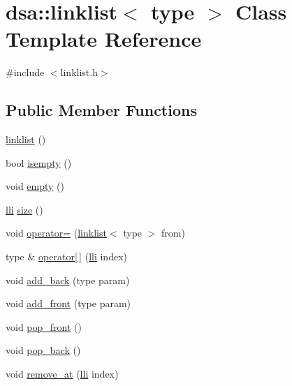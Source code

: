 \hypertarget{classdsa_1_1linklist}{}\section{dsa\+:\+:linklist$<$ type $>$ Class Template Reference}
\label{classdsa_1_1linklist}


{\ttfamily \#include $<$linklist.\+h$>$}

\subsection*{Public Member Functions}
\begin{DoxyCompactItemize}
\item 
\hyperlink{classdsa_1_1linklist_af9adb0aac16e729d04a7bcee71bebd0d}{linklist} ()
\item 
bool \hyperlink{classdsa_1_1linklist_ab79de151e0dc05cd094df6d2ffef4336}{isempty} ()
\item 
void \hyperlink{classdsa_1_1linklist_ae84c70aba1fca71026447c57487867b6}{empty} ()
\item 
\hyperlink{stack_8h_a96af8849ee4b26a038050e55b234f7e6}{lli} \hyperlink{classdsa_1_1linklist_a516bafb367149ce4ca88027dac2df54d}{size} ()
\item 
void \hyperlink{classdsa_1_1linklist_aac8df7165a66811e8af38963b4d90432}{operator=} (\hyperlink{classdsa_1_1linklist}{linklist}$<$ type $>$ from)
\item 
type \& \hyperlink{classdsa_1_1linklist_ad3d448d6f9461d229972ce8f54bce902}{operator\mbox{[}$\,$\mbox{]}} (\hyperlink{stack_8h_a96af8849ee4b26a038050e55b234f7e6}{lli} index)
\item 
void \hyperlink{classdsa_1_1linklist_a3ef6c296e9381c244c88e81ded17cae5}{add\+\_\+back} (type param)
\item 
void \hyperlink{classdsa_1_1linklist_a5635713d959008510a0c7aafc4e1c858}{add\+\_\+front} (type param)
\item 
void \hyperlink{classdsa_1_1linklist_a16dccca4e9a99ab82c72e19912d2e6bf}{pop\+\_\+front} ()
\item 
void \hyperlink{classdsa_1_1linklist_ac2ed79a708e1cdf4aa27f0aae814c179}{pop\+\_\+back} ()
\item 
void \hyperlink{classdsa_1_1linklist_af02ff4b64404da86899c9363d80b0a62}{remove\+\_\+at} (\hyperlink{stack_8h_a96af8849ee4b26a038050e55b234f7e6}{lli} index)
\end{DoxyCompactItemize}


